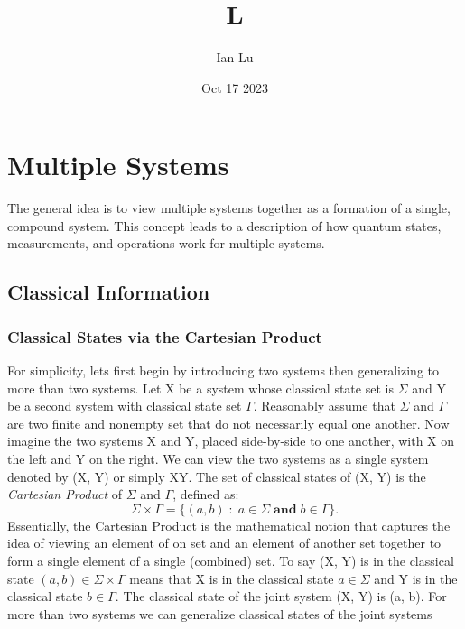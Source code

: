 \documentclass[11pt]{scrartcl}
\title{L}
\author{Ian Lu}
\date{Oct 17 2023}
\begin{document}
\title{}
\section{Multiple Systems}
The general idea is to view multiple systems together as a formation of a single, compound system. This concept 
leads to a description of how quantum states, measurements, and operations work for multiple systems.
\subsection{Classical Information}
\subsubsection{Classical States via the Cartesian Product}
For simplicity, lets first begin by introducing two systems then generalizing to more than two systems.
Let X be a system whose classical state set is $\Sigma$ and Y be a second system with classical state set $\Gamma$.
Reasonably assume that $\Sigma$ and $\Gamma$ are two finite and nonempty set that do not necessarily equal one another.
Now imagine the two systems X and Y, placed side-by-side to one another, with X on the left and Y on the right. We can view the two systems
as a single system denoted by (X, Y) or simply XY. The set of classical states of (X, Y) is the \textit{Cartesian Product} of 
$\Sigma$ and $\Gamma$, defined as:
$$\Sigma \times \Gamma = \{(a, b) \; : \; a\in\Sigma \; \textbf{and} \; b\in\Gamma \}.$$
Essentially, the Cartesian Product is the mathematical notion that captures the idea of viewing an element of on set and an element of another set together to 
form a single element of a single (combined) set. 
To say (X, Y) is in the classical state $(a, b)\in\Sigma \times \Gamma$ means that X is in the classical state $a\in\Sigma$ and Y is in the classical state
$b\in\Gamma$. The classical state of the joint system (X, Y) is (a, b).
For more than two systems we can generalize classical states of the joint systems 
\end{document}
